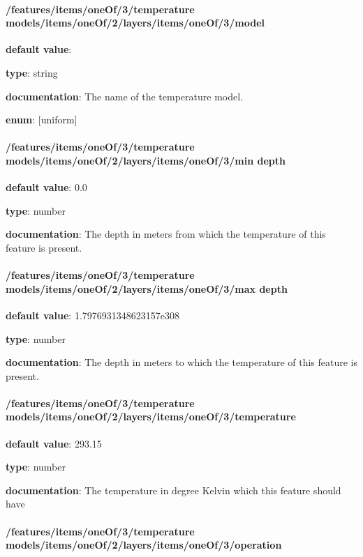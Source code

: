 \paragraph{/features/items/oneOf/3/temperature models/items/oneOf/2/layers/items/oneOf/3/model} \begin{itemized}
\item {\bf default value}: 
\item {\bf type}: string
\item {\bf documentation}: The name of the temperature model.
\item {\bf enum}: [uniform]\end{itemized}\paragraph{/features/items/oneOf/3/temperature models/items/oneOf/2/layers/items/oneOf/3/min depth} \begin{itemized}
\item {\bf default value}: 0.0
\item {\bf type}: number
\item {\bf documentation}: The depth in meters from which the temperature of this feature is present.
\end{itemized}\paragraph{/features/items/oneOf/3/temperature models/items/oneOf/2/layers/items/oneOf/3/max depth} \begin{itemized}
\item {\bf default value}: 1.7976931348623157e308
\item {\bf type}: number
\item {\bf documentation}: The depth in meters to which the temperature of this feature is present.
\end{itemized}\paragraph{/features/items/oneOf/3/temperature models/items/oneOf/2/layers/items/oneOf/3/temperature} \begin{itemized}
\item {\bf default value}: 293.15
\item {\bf type}: number
\item {\bf documentation}: The temperature in degree Kelvin which this feature should have
\end{itemized}\paragraph{/features/items/oneOf/3/temperature models/items/oneOf/2/layers/items/oneOf/3/operation} \begin{itemized}

\end{itemized}
